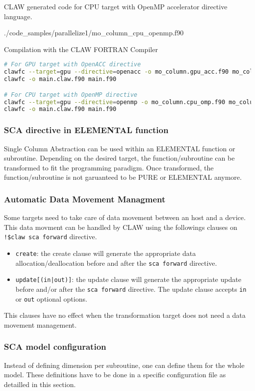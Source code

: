 CLAW generated code for CPU target with OpenMP accelerator directive language.

  {./code_samples/parallelize1/mo_column_cpu_openmp.f90}

Compilation with the CLAW FORTRAN Compiler
\begin{lstlisting}[language=bash]
# For GPU target with OpenACC directive
clawfc --target=gpu --directive=openacc -o mo_column.gpu_acc.f90 mo_column.f90
clawfc -o main.claw.f90 main.f90

# For CPU target with OpenMP directive
clawfc --target=gpu --directive=openmp -o mo_column.cpu_omp.f90 mo_column.f90
clawfc -o main.claw.f90 main.f90
\end{lstlisting}

\subsubsection{SCA directive in ELEMENTAL function}
Single Column Abstraction can be used within an ELEMENTAL function or
subroutine. Depending on the desired target, the function/subroutine can be
transformed to fit the programming paradigm. Once transformed, the
function/subroutine is not garuanteed to be PURE or ELEMENTAL anymore.

\subsubsection{Automatic Data Movement Managment}
Some targets need to take care of data movement between an host and a device.
This data movment can be handled by CLAW using the followings clauses on
\lstinline|!$claw sca forward| directive.%

\begin{itemize}
  \item \lstinline|create|: the create clause will generate the appropriate
        data allocation/deallocation before and after the
        \lstinline|sca forward| directive.
  \item \lstinline!update[(in|out)]!: the update clause will generate the 
        appropriate update before and/or after the \lstinline|sca forward| 
        directive. The update clause accepts \lstinline|in| or \lstinline|out| 
        optional options.
\end{itemize}

This clauses have no effect when the transformation target does not need a
data movement management.

\subsubsection{SCA model configuration}
Instead of defining dimension per subroutine, one can define them for the whole 
model. These definitions have to be done in a specific configuration file as 
detailled in this section.
  
